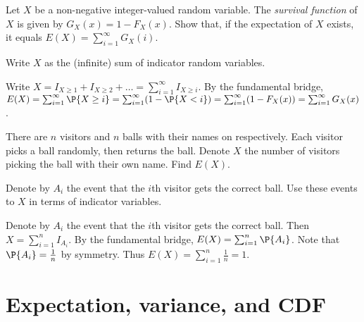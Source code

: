 \begin{exercise}
	Let $X$ be a non-negative integer-valued random variable. The \emph{survival function} of $X$ is given by $G_X(x) = 1 - F_X(x)$. Show that, if the expectation of $X$ exists, it equals $E(X) = \sum_{i = 1}^{\infty} G_X(i)$.
	\begin{hint}
		Write $X$ as the (infinite) sum of indicator random variables.
	\end{hint}
	\begin{solution}
		Write $X = I_{X \geq 1} + I_{X \geq 2} + \hdots = \sum_{i = 1}^{\infty} I_{X \geq i}$. By the fundamental bridge, $E(X) = \sum_{i = 1}^{\infty} \P{X \geq i} = \sum_{i = 1}^{\infty} (1 - \P{X < i}) = \sum_{i = 1}^{\infty} (1 - F_X(x)) = \sum_{i = 1}^{\infty} G_X(x)$.
	\end{solution}
\end{exercise}

\begin{exercise}
	There are $n$ visitors and $n$ balls with their names on respectively. Each visitor picks a ball randomly, then returns the ball. Denote $X$ the number of visitors picking the ball with their own name. Find $E(X)$.
	\begin{hint}
		Denote by $A_i$ the event that the $i$th visitor gets the correct ball. Use these events to $X$ in terms of indicator variables.
	\end{hint}
	\begin{solution}
		Denote by $A_i$ the event that the $i$th visitor gets the correct ball. Then $X = \sum_{i = 1}^n I_{A_i}$. By the fundamental bridge, $E(X) = \sum_{i = 1}^n \P{A_i}$. Note that $\P{A_i} = \frac{1}{n}$ by symmetry. Thus $E(X) = \sum_{i = 1}^n \frac{1}{n} = 1$.
	\end{solution}
\end{exercise}

\section{Expectation, variance, and CDF}
\label{sec:section-4.4}

